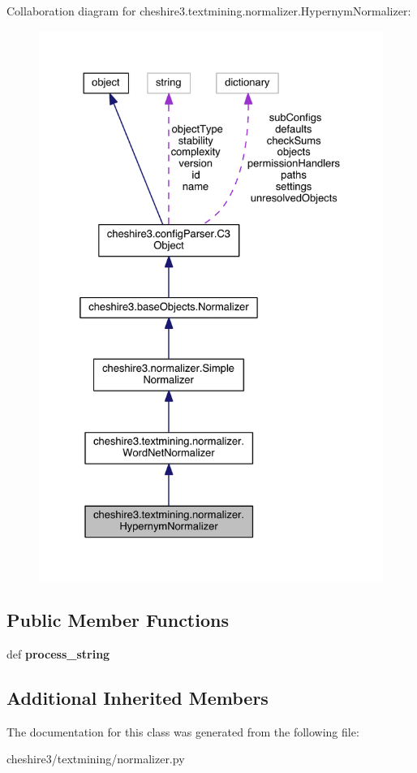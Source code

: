 Collaboration diagram for cheshire3.\-textmining.\-normalizer.\-Hypernym\-Normalizer\-:
\nopagebreak
\begin{figure}[H]
\begin{center}
\leavevmode
\includegraphics[width=328pt]{classcheshire3_1_1textmining_1_1normalizer_1_1_hypernym_normalizer__coll__graph}
\end{center}
\end{figure}
\subsection*{Public Member Functions}
\begin{DoxyCompactItemize}
\item 
\hypertarget{classcheshire3_1_1textmining_1_1normalizer_1_1_hypernym_normalizer_a8cc2b1648d367d36ba2d85723d6e3d8e}{def {\bfseries process\-\_\-string}}\label{classcheshire3_1_1textmining_1_1normalizer_1_1_hypernym_normalizer_a8cc2b1648d367d36ba2d85723d6e3d8e}

\end{DoxyCompactItemize}
\subsection*{Additional Inherited Members}


The documentation for this class was generated from the following file\-:\begin{DoxyCompactItemize}
\item 
cheshire3/textmining/normalizer.\-py\end{DoxyCompactItemize}
